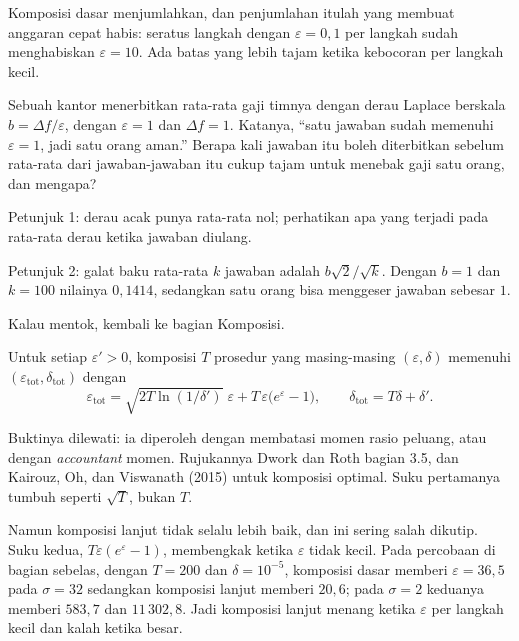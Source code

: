 Komposisi dasar menjumlahkan, dan penjumlahan itulah yang membuat anggaran cepat habis:
seratus langkah dengan $\varepsilon=0{,}1$ per langkah sudah menghabiskan
$\varepsilon=10$. Ada batas yang lebih tajam ketika kebocoran per langkah kecil.

\begin{tantangan}
Sebuah kantor menerbitkan rata-rata gaji timnya dengan derau Laplace berskala
$b=\Delta f/\varepsilon$, dengan $\varepsilon=1$ dan $\Delta f=1$. Katanya, ``satu
jawaban sudah memenuhi $\varepsilon=1$, jadi satu orang aman.'' Berapa kali jawaban itu
boleh diterbitkan sebelum rata-rata dari jawaban-jawaban itu cukup tajam untuk menebak
gaji satu orang, dan mengapa?

Petunjuk 1: derau acak punya rata-rata nol; perhatikan apa yang terjadi pada rata-rata
derau ketika jawaban diulang.

Petunjuk 2: galat baku rata-rata $k$ jawaban adalah $b\sqrt{2}/\sqrt{k}$. Dengan $b=1$
dan $k=100$ nilainya $0{,}1414$, sedangkan satu orang bisa menggeser jawaban sebesar
$1$.

Kalau mentok, kembali ke bagian Komposisi.
\end{tantangan}

\begin{teorema}
Untuk setiap $\varepsilon'>0$, komposisi $T$ prosedur yang masing-masing
$(\varepsilon,\delta)$ memenuhi $(\varepsilon_{\mathrm{tot}},\delta_{\mathrm{tot}})$
dengan
\begin{equation}
\varepsilon_{\mathrm{tot}} = \sqrt{2T\ln(1/\delta')}\;\varepsilon
+ T\,\varepsilon\bigl(e^{\varepsilon}-1\bigr),
\qquad
\delta_{\mathrm{tot}} = T\delta + \delta' .
\end{equation}
\end{teorema}

Buktinya dilewati: ia diperoleh dengan membatasi momen rasio peluang, atau dengan
\emph{accountant} momen. Rujukannya Dwork dan Roth bagian 3.5, dan Kairouz, Oh, dan
Viswanath (2015) untuk komposisi optimal. Suku pertamanya tumbuh seperti $\sqrt{T}$, bukan $T$.

Namun komposisi lanjut tidak selalu lebih baik, dan ini sering salah dikutip. Suku
kedua, $T\varepsilon(e^{\varepsilon}-1)$, membengkak ketika $\varepsilon$ tidak kecil.
Pada percobaan di bagian sebelas, dengan $T=200$ dan $\delta=10^{-5}$, komposisi dasar
memberi $\varepsilon=36{,}5$ pada $\sigma=32$ sedangkan komposisi lanjut memberi
$20{,}6$; pada $\sigma=2$ keduanya memberi $583{,}7$ dan $11\,302{,}8$. Jadi komposisi
lanjut menang ketika $\varepsilon$ per langkah kecil dan kalah ketika besar.


